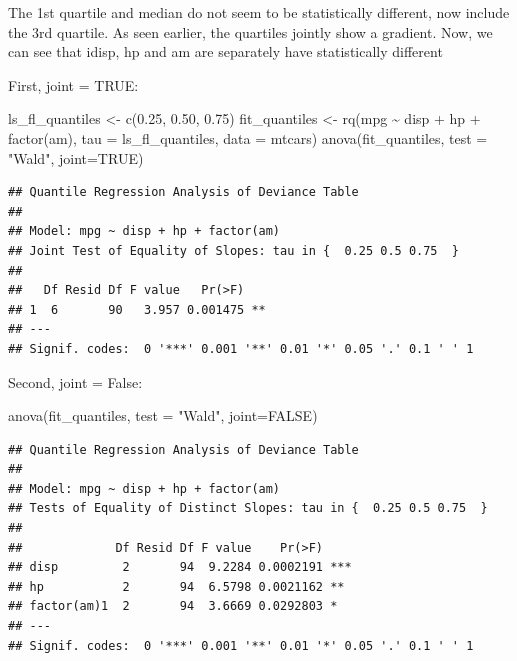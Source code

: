 \documentclass[
]{book}
\newenvironment{Shaded}{\begin{snugshade}}{\end{snugshade}}
\newcommand{\AttributeTok}[1]{\textcolor[rgb]{0.77,0.63,0.00}{#1}}
\newcommand{\ConstantTok}[1]{\textcolor[rgb]{0.00,0.00,0.00}{#1}}
\newcommand{\FloatTok}[1]{\textcolor[rgb]{0.00,0.00,0.81}{#1}}
\newcommand{\FunctionTok}[1]{\textcolor[rgb]{0.00,0.00,0.00}{#1}}
\newcommand{\NormalTok}[1]{#1}
\newcommand{\OtherTok}[1]{\textcolor[rgb]{0.56,0.35,0.01}{#1}}
\newcommand{\SpecialCharTok}[1]{\textcolor[rgb]{0.00,0.00,0.00}{#1}}
\newcommand{\StringTok}[1]{\textcolor[rgb]{0.31,0.60,0.02}{#1}}
\begin{document}
The 1st quartile and median do not seem to be statistically different, now include the 3rd quartile. As seen earlier, the quartiles jointly show a gradient. Now, we can see that idisp, hp and am are separately have statistically different

First, joint = TRUE:

\begin{Shaded}
\begin{Highlighting}[]
\NormalTok{ls\_fl\_quantiles }\OtherTok{\textless{}{-}} \FunctionTok{c}\NormalTok{(}\FloatTok{0.25}\NormalTok{, }\FloatTok{0.50}\NormalTok{, }\FloatTok{0.75}\NormalTok{)}
\NormalTok{fit\_quantiles }\OtherTok{\textless{}{-}} \FunctionTok{rq}\NormalTok{(mpg }\SpecialCharTok{\textasciitilde{}}\NormalTok{ disp }\SpecialCharTok{+}\NormalTok{ hp }\SpecialCharTok{+} \FunctionTok{factor}\NormalTok{(am),}
               \AttributeTok{tau =}\NormalTok{ ls\_fl\_quantiles,}
               \AttributeTok{data =}\NormalTok{ mtcars)}
\FunctionTok{anova}\NormalTok{(fit\_quantiles, }\AttributeTok{test =} \StringTok{"Wald"}\NormalTok{, }\AttributeTok{joint=}\ConstantTok{TRUE}\NormalTok{)}
\end{Highlighting}
\end{Shaded}

\begin{verbatim}
## Quantile Regression Analysis of Deviance Table
## 
## Model: mpg ~ disp + hp + factor(am)
## Joint Test of Equality of Slopes: tau in {  0.25 0.5 0.75  }
## 
##   Df Resid Df F value   Pr(>F)   
## 1  6       90   3.957 0.001475 **
## ---
## Signif. codes:  0 '***' 0.001 '**' 0.01 '*' 0.05 '.' 0.1 ' ' 1
\end{verbatim}

Second, joint = False:

\begin{Shaded}
\begin{Highlighting}[]
\FunctionTok{anova}\NormalTok{(fit\_quantiles, }\AttributeTok{test =} \StringTok{"Wald"}\NormalTok{, }\AttributeTok{joint=}\ConstantTok{FALSE}\NormalTok{)}
\end{Highlighting}
\end{Shaded}

\begin{verbatim}
## Quantile Regression Analysis of Deviance Table
## 
## Model: mpg ~ disp + hp + factor(am)
## Tests of Equality of Distinct Slopes: tau in {  0.25 0.5 0.75  }
## 
##             Df Resid Df F value    Pr(>F)    
## disp         2       94  9.2284 0.0002191 ***
## hp           2       94  6.5798 0.0021162 ** 
## factor(am)1  2       94  3.6669 0.0292803 *  
## ---
## Signif. codes:  0 '***' 0.001 '**' 0.01 '*' 0.05 '.' 0.1 ' ' 1
\end{verbatim}
\end{document}
